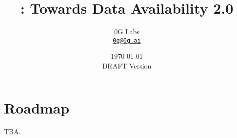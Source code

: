 \documentclass[letterpaper,11pt]{article}
\title{\LARGE \project:
	\Large Towards Data Availability 2.0}
\author{
		0G Labs\\
		\small\href{mailto:0g@0g.ai}
			{\nolinkurl{0g@0g.ai}}
	}
\date{\today\\\small DRAFT Version}
\begin{document}
\maketitle
\flushbottom %




\setcounter{tocdepth}{3}

\tableofcontents %

\thispagestyle{empty} %


\newpage













\section{Roadmap}

TBA.



\end{document}
